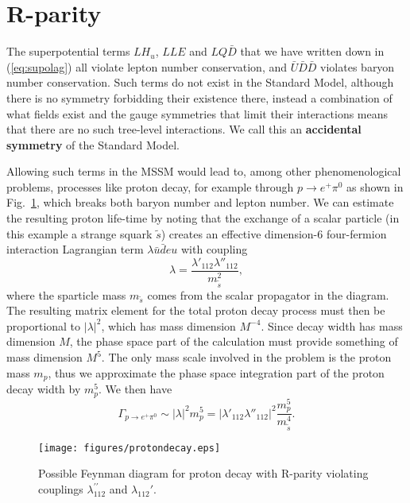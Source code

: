 \documentclass[notes.tex]{subfiles}
\begin{document}
\section{R-parity}
The superpotential terms $LH_u$, $LLE$ and $LQ\bar{D}$ that we have written down in (\ref{eq:supolag}) all violate lepton number conservation, and $\bar{U}\bar{D}\bar{D}$ violates baryon number conservation. Such terms do not exist in the Standard Model, although there is no symmetry forbidding their existence there, instead a combination of what fields exist and the gauge symmetries that limit their interactions means that there are no such tree-level interactions. We call this an {\bf accidental symmetry} of the Standard Model.  

Allowing such terms in the MSSM would lead to, among other phenomenological problems, processes like proton decay, for example through $p\to e^+ \pi^0$ as shown in Fig.~\ref{fig:proton}, which breaks both baryon number and lepton number. We can estimate the resulting proton life-time by noting that the exchange of a scalar particle (in this example a strange squark $\tilde s$) creates an effective dimension-6 four-fermion interaction Lagrangian term $\lambda\bar u \bar deu$ with coupling 
\begin{equation}
\lambda = \frac{\lambda'_{112}\lambda''_{112}}{m_{\tilde{s}}^2},
\end{equation}
where the sparticle mass $m_{\tilde s}$ comes from the scalar propagator in the diagram. The resulting matrix element for the total proton decay process must then be proportional to $|\lambda|^2$, which has mass dimension $M^{-4}$. Since decay width has mass dimension $M$, the phase space part of the calculation must provide something of mass dimension $M^5$.
The only mass scale involved in the problem is the proton mass $m_p$, thus we approximate the phase space integration part of the proton decay width by $m_p^5$. We then have
\begin{equation}
\Gamma_{p\to e^+ \pi^0} \sim |\lambda|^2 m_p^5 = |\lambda'_{112}\lambda''_{112}|^2\frac{m_p^5}{m_{\tilde{s}}^4}.
\end{equation}

\begin{figure}[h]
\begin{center}
\texttt{[image: figures/protondecay.eps]}
\caption{Possible Feynman diagram for proton decay with R-parity violating couplings $\lambda_{112}^{\prime\prime}$ and $\lambda_{112}'$.\label{fig:proton}}
\end{center}
\end{figure}
\end{document}
